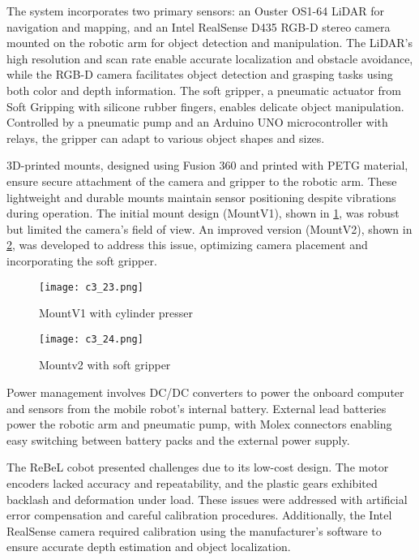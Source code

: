 The system incorporates two primary sensors: an Ouster OS1-64 LiDAR for navigation and mapping, and an Intel 
RealSense D435 RGB-D stereo camera mounted on the robotic arm for object detection and manipulation. 
The LiDAR's high resolution and scan rate enable accurate localization and obstacle avoidance, while the RGB-D 
camera facilitates object detection and grasping tasks using both color and depth information.
The soft gripper, a pneumatic actuator from Soft Gripping with silicone rubber fingers, enables delicate object
manipulation. Controlled by a pneumatic pump and an Arduino UNO microcontroller with relays, the gripper can 
adapt to various object shapes and sizes.

3D-printed mounts, designed using Fusion 360 and printed with PETG material, ensure secure attachment of the 
camera and gripper to the robotic arm. These lightweight and durable mounts maintain sensor positioning despite
vibrations during operation.
The initial mount design (MountV1), shown in \ref{fig:mountv1}, was robust but limited the camera's field of view. 
An improved version (MountV2), shown in \ref{fig:mountv2},
was developed to address this issue, optimizing camera placement and incorporating the soft gripper.

\begin{figure}[H]
    \centering
    \texttt{[image: c3\_23.png]}
    \caption{MountV1 with cylinder presser}
    \label{fig:mountv1}
\end{figure}

\begin{figure}[H]
    \centering
    \texttt{[image: c3\_24.png]}
    \caption{Mountv2 with soft gripper}
    \label{fig:mountv2}
\end{figure}

Power management involves DC/DC converters to power the onboard computer and sensors from the mobile robot's 
internal battery. External lead batteries power the robotic arm and pneumatic pump, with Molex connectors enabling
easy switching between battery packs and the external power supply.

The ReBeL cobot presented challenges due to its low-cost design. The motor encoders lacked accuracy and repeatability,
and the plastic gears exhibited backlash and deformation under load. These issues were addressed with artificial 
error compensation and careful calibration procedures.
Additionally, the Intel RealSense camera required calibration using the manufacturer's software to ensure accurate
depth estimation and object localization.

